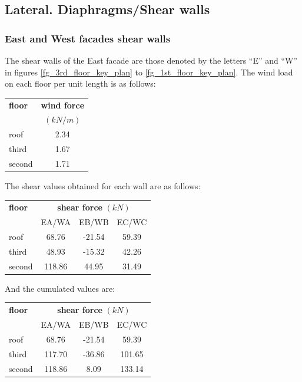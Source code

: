 \subsection{Lateral. Diaphragms/Shear walls}

\subsubsection{East and West facades shear walls}
The shear walls of the East facade are those denoted by the letters ``E'' and ``W'' in figures \ref{fg_3rd_floor_key_plan} to \ref{fg_1st_floor_key_plan}. The wind load on each floor per unit length is as follows:

\begin{center}
  \begin{tabular}{|l|c|}
    \hline
    \textbf{floor} & \textbf{wind force}\\
    & $(kN/m)$\\
    \hline
    roof & 2.34 \\
    third & 1.67 \\
    second & 1.71 \\
    \hline
  \end{tabular}
\end{center}  

\noindent The shear values obtained for each wall are as follows:

\begin{center}
  \begin{tabular}{|l|c|c|c|}
    \hline
    \textbf{floor} & \multicolumn{3}{c|}{\textbf{shear force} $(kN)$}\\
                   & EA/WA & EB/WB & EC/WC \\
    \hline
    roof & 68.76 & -21.54 & 59.39 \\
    third & 48.93 & -15.32 & 42.26 \\
    second & 118.86 & 44.95 & 31.49 \\
    \hline
  \end{tabular}
\end{center}  

\noindent And the cumulated values are:

\begin{center}
  \begin{tabular}{|l|c|c|c|}
    \hline
    \textbf{floor} & \multicolumn{3}{c|}{\textbf{shear force} $(kN)$}\\
                   & EA/WA & EB/WB & EC/WC \\
    \hline
    roof & 68.76 & -21.54 & 59.39 \\
    third & 117.70 & -36.86 & 101.65 \\
    second & 118.86 & 8.09 & 133.14 \\
    \hline
  \end{tabular}
\end{center}


